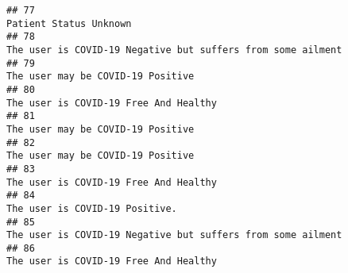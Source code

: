 \documentclass[
]{article}
\begin{document}
\begin{verbatim}
## 77                                                                                                                                                                                                                                              Patient Status Unknown
## 78                                                                                                                                                                                                         The user is COVID-19 Negative but suffers from some ailment
## 79                                                                                                                                                                                                                                   The user may be COVID-19 Positive
## 80                                                                                                                                                                                                                               The user is COVID-19 Free And Healthy
## 81                                                                                                                                                                                                                                   The user may be COVID-19 Positive
## 82                                                                                                                                                                                                                                   The user may be COVID-19 Positive
## 83                                                                                                                                                                                                                               The user is COVID-19 Free And Healthy
## 84                                                                                                                                                                                                                                      The user is COVID-19 Positive.
## 85                                                                                                                                                                                                         The user is COVID-19 Negative but suffers from some ailment
## 86                                                                                                                                                                                                                               The user is COVID-19 Free And Healthy

\end{verbatim}
\end{document}
